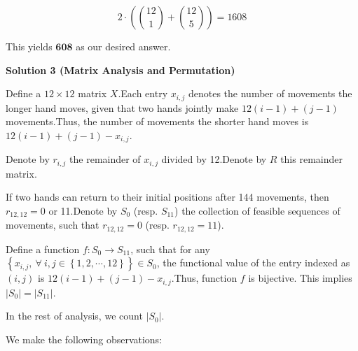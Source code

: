 \begin{enumerate}
{{ 
 \[2\cdot\left(\binom{12}{1} + \binom{12}{5}\right) = 1608\]

 This yields $\boxed{\textbf{608}}$ as our desired answer.

 



\textbf{Solution 3 (Matrix Analysis and Permutation)}

Define a $12 \times 12$ matrix $X$.Each entry $x_{i, j}$ denotes the number of movements the longer hand moves, given that two hands jointly make $12 \left( i - 1 \right) + \left( j - 1 \right)$ movements.Thus, the number of movements the shorter hand moves is $12 \left( i - 1 \right) + \left( j - 1 \right) - x_{i, j}$.

 Denote by $r_{i, j}$ the remainder of $x_{i, j}$ divided by 12.Denote by $R$ this remainder matrix.

 If two hands can return to their initial positions after 144 movements, then $r_{12, 12} = 0$ or 11.Denote by $S_0$ (resp. $S_{11}$) the collection of feasible sequences of movements, such that $r_{12, 12} = 0$ (resp. $r_{12, 12} = 11$).

 Define a function $f :  S_0 \rightarrow S_{11}$, such that for any $\left\{ x_{i,j} , \ \forall \ i, j \in \left\{ 1, 2, \cdots , 12 \right\} \right\} \in S_0$, the functional value of the entry indexed as $\left( i, j \right)$ is $12 \left( i - 1 \right) + \left( j - 1 \right) - x_{i, j}$.Thus, function $f$ is bijective. This implies $| S_0 | = | S_{11} |$.

 In the rest of analysis, we count $| S_0 |$.

 We make the following observations:

}}
\end{enumerate}
